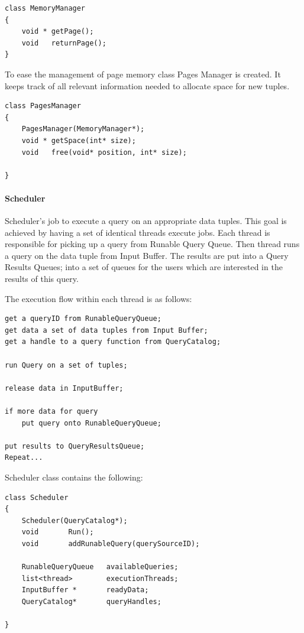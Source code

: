 \documentclass[11pt]{article}
\begin{document}
\begin{verbatim}
class MemoryManager
{
    void * getPage();
	void   returnPage();
}
\end{verbatim}

\noindent To ease the management of page memory class Pages Manager is created. It keeps track of all relevant information needed to allocate space for new tuples.

\begin{verbatim}
class PagesManager
{
    PagesManager(MemoryManager*);
    void * getSpace(int* size);
    void   free(void* position, int* size);
    
}
\end{verbatim}

\paragraph{Scheduler}

Scheduler's job to execute a query on an appropriate data tuples. This goal is achieved by having a set of identical threads execute jobs. Each thread is responsible for picking up a query from Runable Query Queue. Then thread runs a query on the data tuple from Input Buffer. The results are put into a Query Results Queues; into a set of queues for the users which are interested in the results of this query. 

The execution flow within each thread is as follows:

\begin{verbatim}
get a queryID from RunableQueryQueue;
get data a set of data tuples from Input Buffer;
get a handle to a query function from QueryCatalog;

run Query on a set of tuples;

release data in InputBuffer;

if more data for query 
	put query onto RunableQueryQueue;

put results to QueryResultsQueue;
Repeat...

\end{verbatim}

Scheduler class contains the following:

\begin{verbatim}
class Scheduler
{
	Scheduler(QueryCatalog*);
    void       Run();
    void       addRunableQuery(querySourceID);

    RunableQueryQueue   availableQueries;
    list<thread>        executionThreads;
    InputBuffer *       readyData;
	QueryCatalog*       queryHandles;
	
}
\end{verbatim}
\end{document}
